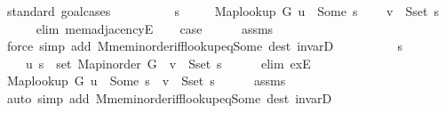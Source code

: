 \begin{isabellebody}
\endisataginvisible
{\isafoldinvisible}%
%
\isadeliminvisible
\isanewline
%
\endisadeliminvisible
%
\isadelimproof
%
\endisadelimproof
%
\isatagproof
{}\isamarkupfalse%
\ {\isacharparenleft}{\kern0pt}standard{\isacharcomma}{\kern0pt}\ goal{\isacharunderscore}{\kern0pt}cases{\isacharparenright}{\kern0pt}\isanewline
\ \ \isamarkupfalse%
\ {}\isanewline
\ \ \isamarkupfalse%
\ \isamarkupfalse%
\ s\ \isanewline
\ \ \ \ {\isachardoublequoteopen}Map{\isacharunderscore}{\kern0pt}lookup\ G\ u\ {\isacharequal}{\kern0pt}\ Some\ s{\isachardoublequoteclose}\isanewline
\ \ \ \ {\isachardoublequoteopen}v\ {\isasymin}\ S{\isachardot}{\kern0pt}set\ s{\isachardoublequoteclose}\isanewline
\ \ \ \ \isamarkupfalse%
\ {\isacharparenleft}{\kern0pt}elim\ mem{\isacharunderscore}{\kern0pt}adjacencyE{\isacharparenright}{\kern0pt}\isanewline
\ \ \isamarkupfalse%
\ {\isacharquery}{\kern0pt}case\isanewline
\ \ \ \ \isamarkupfalse%
\ assms\isanewline
\ \ \ \ \isamarkupfalse%
\ {\isacharparenleft}{\kern0pt}force\ simp\ add{\isacharcolon}{\kern0pt}\ M{\isachardot}{\kern0pt}mem{\isacharunderscore}{\kern0pt}inorder{\isacharunderscore}{\kern0pt}iff{\isacharunderscore}{\kern0pt}lookup{\isacharunderscore}{\kern0pt}eq{\isacharunderscore}{\kern0pt}Some\ dest{\isacharcolon}{\kern0pt}\ invarD{\isacharparenleft}{\kern0pt}{}{\isacharparenright}{\kern0pt}{\isacharparenright}{\kern0pt}\isanewline
{}\isamarkupfalse%
\isanewline
\ \ \isamarkupfalse%
\ {}\isanewline
\ \ \isamarkupfalse%
\ \isamarkupfalse%
\ s\ \isanewline
\ \ \ \ {\isachardoublequoteopen}{\isacharparenleft}{\kern0pt}u{\isacharcomma}{\kern0pt}\ s{\isacharparenright}{\kern0pt}\ {\isasymin}\ set\ {\isacharparenleft}{\kern0pt}Map{\isacharunderscore}{\kern0pt}inorder\ G{\isacharparenright}{\kern0pt}\ {\isasymand}\ v\ {\isasymin}\ S{\isachardot}{\kern0pt}set\ s{\isachardoublequoteclose}\isanewline
\ \ \ \ \isamarkupfalse%
\ {\isacharparenleft}{\kern0pt}elim\ exE{\isacharparenright}{\kern0pt}\isanewline
\ \ \isamarkupfalse%
\ {\isachardoublequoteopen}Map{\isacharunderscore}{\kern0pt}lookup\ G\ u\ {\isacharequal}{\kern0pt}\ Some\ s\ {\isasymand}\ v\ {\isasymin}\ S{\isachardot}{\kern0pt}set\ s{\isachardoublequoteclose}\isanewline
\ \ \ \ \isamarkupfalse%
\ assms\isanewline
\ \ \ \ \isamarkupfalse%
\ {\isacharparenleft}{\kern0pt}auto\ simp\ add{\isacharcolon}{\kern0pt}\ M{\isachardot}{\kern0pt}mem{\isacharunderscore}{\kern0pt}inorder{\isacharunderscore}{\kern0pt}iff{\isacharunderscore}{\kern0pt}lookup{\isacharunderscore}{\kern0pt}eq{\isacharunderscore}{\kern0pt}Some\ dest{\isacharcolon}{\kern0pt}\ invarD{\isacharparenleft}{\kern0pt}{}{\isacharparenright}{\kern0pt}{\isacharparenright}{\kern0pt}\isanewline

\end{isabellebody}
